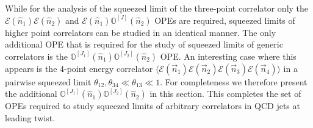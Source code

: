 \documentclass[letterpaper,11pt]{article}
\begin{document}
While for the analysis of the squeezed limit of the three-point correlator only the  $\mathcal{E}(\hat n_1) \mathcal{E}(\hat n_2)$ and $\mathcal{E}(\hat n_1) \mathbb{O}^{[J]}(\hat n_2) $ OPEs are required,  squeezed limits of higher point correlators can be studied in an identical manner. The only additional OPE that is required for the study of squeezed limits of generic correlators is the  $\mathbb{O}^{[J_1]}(\hat n_1) \mathbb{O}^{[J_2]}(\hat n_2) $ OPE. An interesting case where this appears is the 4-point energy correlator $\langle\mathcal{E}(\vec{n}_1) \mathcal{E}(\vec{n}_2)\mathcal{E}(\vec{n}_3)\mathcal{E}(\vec{n}_4) \rangle$ in a pairwise squeezed limit $\theta_{12},\theta_{34}\ll \theta_{13}\ll 1$. For completeness we therefore present the additional $\mathbb{O}^{[J_1]}(\hat n_1) \mathbb{O}^{[J_2]}(\hat n_2) $ in this section. This completes the set of OPEs required to study squeezed limits of arbitrary correlators in QCD jets at leading twist.
\end{document}
